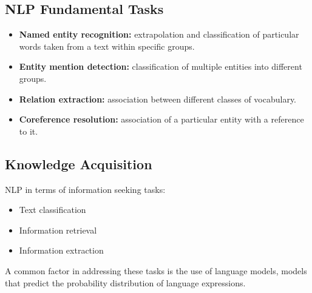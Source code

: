 \subsection{NLP Fundamental Tasks}
\begin{itemize}
    \item \textbf{Named entity recognition:} extrapolation and classification of particular words taken from a text within specific groups.
    \item \textbf{Entity mention detection:} classification of multiple entities into different groups.
    \item \textbf{Relation extraction:} association between different classes of vocabulary.
    \item \textbf{Coreference resolution:} association of a particular entity with a reference to it.
\end{itemize}

\subsection{Knowledge Acquisition}
NLP in terms of information seeking tasks:
\begin{itemize}
    \item Text classification
    \item Information retrieval
    \item Information extraction
\end{itemize}
A common factor in addressing these tasks is the use of language models, models that predict the probability distribution of language expressions.

\newpage